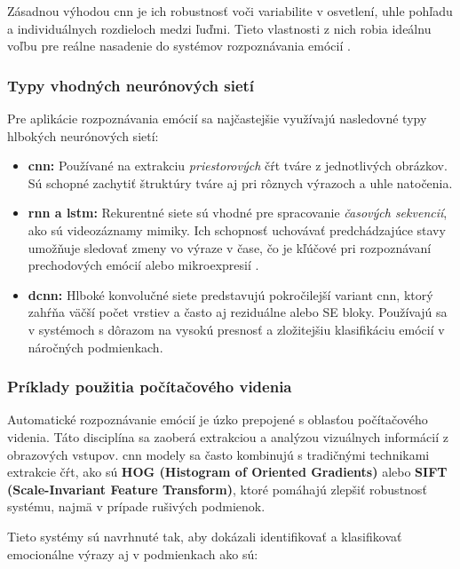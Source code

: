 Zásadnou výhodou \gls{cnn} je ich robustnosť voči variabilite v osvetlení, uhle pohľadu a individuálnych rozdieloch medzi ľuďmi. Tieto vlastnosti z nich robia ideálnu voľbu pre reálne nasadenie do systémov rozpoznávania emócií \cite{article05}.

\subsubsection{Typy vhodných neurónových sietí}

Pre aplikácie rozpoznávania emócií sa najčastejšie využívajú nasledovné typy hlbokých neurónových sietí:

\begin{itemize}
    \item \textbf{\gls{cnn}:} Používané na extrakciu \textit{priestorových} čŕt tváre z jednotlivých obrázkov. Sú schopné zachytiť štruktúry tváre aj pri rôznych výrazoch a uhle natočenia.
    
    \item \textbf{\gls{rnn} a \gls{lstm}:} Rekurentné siete sú vhodné pre spracovanie \textit{časových sekvencií}, ako sú videozáznamy mimiky. Ich schopnosť uchovávať predchádzajúce stavy umožňuje sledovať zmeny vo výraze v čase, čo je kľúčové pri rozpoznávaní prechodových emócií alebo mikroexpresií \cite{article02}.
    
    \item \textbf{\gls{dcnn}:} Hlboké konvolučné siete predstavujú pokročilejší variant \gls{cnn}, ktorý zahŕňa väčší počet vrstiev a často aj reziduálne alebo SE bloky. Používajú sa v systémoch s dôrazom na vysokú presnosť a zložitejšiu klasifikáciu emócií v náročných podmienkach.
\end{itemize}

\subsubsection{Príklady použitia počítačového videnia}

Automatické rozpoznávanie emócií je úzko prepojené s oblasťou počítačového videnia. Táto disciplína sa zaoberá extrakciou a analýzou vizuálnych informácií z obrazových vstupov. \gls{cnn} modely sa často kombinujú s tradičnými technikami extrakcie čŕt, ako sú \textbf{HOG (Histogram of Oriented Gradients)} alebo \textbf{SIFT (Scale-Invariant Feature Transform)}, ktoré pomáhajú zlepšiť robustnosť systému, najmä v prípade rušivých podmienok.

Tieto systémy sú navrhnuté tak, aby dokázali identifikovať a klasifikovať emocionálne výrazy aj v podmienkach ako sú:

